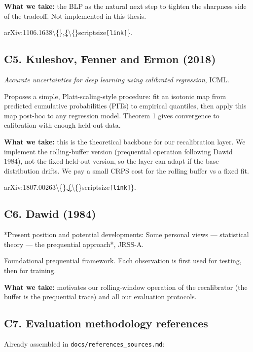 \documentclass[11pt,a4paper,openany]{report}
\begin{document}
\textbf{What we take:} the BLP as the natural next step to tighten the
sharpness side of the tradeoff. Not implemented in this thesis.

arXiv:1106.1638\textbackslash\{\},\href{https://arxiv.org/abs/1106.1638}\{\textbackslash\{\}scriptsize\texttt{[link]}\}.

\subsection{C5. Kuleshov, Fenner and Ermon (2018)}

\emph{Accurate uncertainties for deep learning using calibrated regression},
ICML.

Proposes a simple, Platt-scaling-style procedure: fit an isotonic map
from predicted cumulative probabilities (PITs) to empirical quantiles,
then apply this map post-hoc to any regression model. Theorem 1 gives
convergence to calibration with enough held-out data.

\textbf{What we take:} this is the theoretical backbone for our recalibration
layer. We implement the rolling-buffer version (prequential operation
following Dawid 1984), not the fixed held-out version, so the layer
can adapt if the base distribution drifts. We pay a small CRPS cost
for the rolling buffer vs a fixed fit.

arXiv:1807.00263\textbackslash\{\},\href{https://arxiv.org/abs/1807.00263}\{\textbackslash\{\}scriptsize\texttt{[link]}\}.

\subsection{C6. Dawid (1984)}

*Present position and potential developments: Some personal views —
statistical theory — the prequential approach*, JRSS-A.

Foundational prequential framework. Each observation is first used for
testing, then for training.

\textbf{What we take:} motivates our rolling-window operation of the
recalibrator (the buffer is the prequential trace) and all our
evaluation protocols.

\subsection{C7. Evaluation methodology references}

Already assembled in \texttt{docs/references\_sources.md}:
\end{document}
